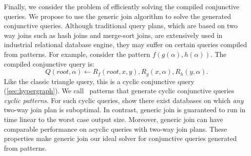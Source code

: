 Finally, we consider the problem of efficiently solving the compiled conjunctive
queries. We propose to use the generic join algorithm to solve the generated
conjunctive queries. Although traditional query plans, which are based on two
way joins such as hash joins and merge-sort joins, are extensively used in
industrial relational database engine, they may suffer on certain queries
compiled from patterns. For example, consider the pattern
$f(g(\alpha),h(\alpha))$. The compiled conjunctive query is:
\begin{equation}
  \label{eqn:cyclic-cq}
  Q(\textit{root},\alpha)\gets
  R_f(\textit{root}, x, y), R_g(x, \alpha), R_h(y, \alpha).
\end{equation}
Like the classic triangle query,
 this is a cyclic conjunctive query (\autoref{sec:hypergraph}).
We call \ematching~patterns that generate cyclic conjunctive
 queries \textit{cyclic patterns}.
For such cyclic queries,
 \citet{wcoj} show there exist databases on which {\em any}
 two-way join plan is suboptimal.
In contrast, generic join is guaranteed to run in time linear
 to the worst case output size.
Moreover, generic join can have comparable performance on acyclic
 queries with two-way join plans.
These properties make generic join our ideal
 solver for conjunctive queries generated from \ematching patterns.


